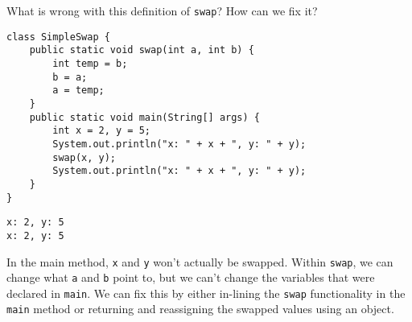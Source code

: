 \question What is wrong with this definition of \texttt{swap}? How can we fix it?

\begin{lstlisting}
class SimpleSwap {
    public static void swap(int a, int b) {
        int temp = b;
        b = a;
        a = temp;
    }
    public static void main(String[] args) {
        int x = 2, y = 5;
        System.out.println("x: " + x + ", y: " + y);
        swap(x, y);
        System.out.println("x: " + x + ", y: " + y);
    }
}
\end{lstlisting}

\begin{solution}[1em]
\begin{verbatim}
x: 2, y: 5
x: 2, y: 5
\end{verbatim}
In the main method, \texttt{x} and \texttt{y} won't actually be swapped.
Within \texttt{swap}, we can change what \texttt{a} and \texttt{b} point to, but we can't change the variables that were declared in \texttt{main}. We can fix this by either in-lining the \texttt{swap} functionality in the \texttt{main} method or returning and reassigning the swapped values using an object.
\end{solution}